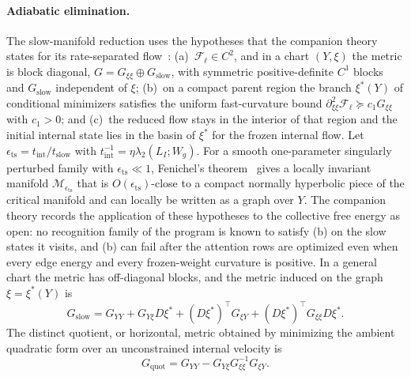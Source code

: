 \paragraph{Adiabatic elimination.}
The slow-manifold reduction uses the hypotheses that the companion theory states for its rate-separated flow~\cite[Ch.~8]{DennisGaugeVFE2026}: (a)~$\mathcal{F}_\ell\in C^2$, and in a chart $(Y,\xi)$ the metric is block diagonal, $G=G_{\xi\xi}\oplus G_{\mathrm{slow}}$, with symmetric positive-definite $C^1$ blocks and $G_{\mathrm{slow}}$ independent of $\xi$; (b)~on a compact parent region the branch $\xi^*(Y)$ of conditional minimizers satisfies the uniform fast-curvature bound $\partial^2_{\xi\xi}\mathcal{F}_\ell\succeq c_1G_{\xi\xi}$ with $c_1>0$; and (c)~the reduced flow stays in the interior of that region and the initial internal state lies in the basin of $\xi^*$ for the frozen internal flow. Let $\epsilon_{\mathrm{ts}}=t_{\mathrm{int}}/t_{\mathrm{slow}}$ with $t_{\mathrm{int}}^{-1}=\eta\lambda_2(L_I;W_g)$. For a smooth one-parameter singularly perturbed family with $\epsilon_{\mathrm{ts}}\ll1$, Fenichel's theorem~\cite{fenichel1979geometric} gives a locally invariant manifold $\mathcal{M}_{\epsilon_{\mathrm{ts}}}$ that is $O(\epsilon_{\mathrm{ts}})$-close to a compact normally hyperbolic piece of the critical manifold and can locally be written as a graph over $Y$. The companion theory records the application of these hypotheses to the collective free energy as open: no recognition family of the program is known to satisfy (b) on the slow states it visits, and (b) can fail after the attention rows are optimized even when every edge energy and every frozen-weight curvature is positive. In a general chart the metric has off-diagonal blocks, and the metric induced on the graph $\xi=\xi^*(Y)$ is
\begin{equation}
G_{\mathrm{slow}}=G_{YY}+G_{Y\xi}D\xi^*+(D\xi^*)^\top G_{\xi Y}+(D\xi^*)^\top G_{\xi\xi}D\xi^*.
\label{eq:rg_slow_graph_metric}
\end{equation}
The distinct quotient, or horizontal, metric obtained by minimizing the ambient quadratic form over an unconstrained internal velocity is
\begin{equation}
G_{\mathrm{quot}}=G_{YY}-G_{Y\xi}G_{\xi\xi}^{-1}G_{\xi Y}.
\end{equation}
